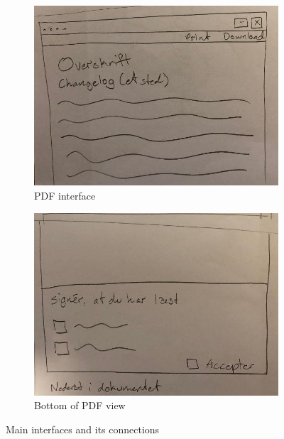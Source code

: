 \begin{figure}[H]\ContinuedFloat
		\centering
		\begin{subfigure}[b]{0.48\textwidth}
			\includegraphics[width=\textwidth]{billeder/pdf-view.jpg}
			\caption{PDF interface}
			\label{fig:1-pdf}
		\end{subfigure}
		\quad
		\begin{subfigure}[b]{0.48\textwidth}
			\includegraphics[width=\textwidth]{billeder/bottom-pdf-view.jpg}
			\caption{Bottom of PDF view}
			\label{fig:1-bottom-pdf}
		\end{subfigure}
		\caption{Main interfaces and its connections}\label{fig:1-MainPages}
\end{figure}

